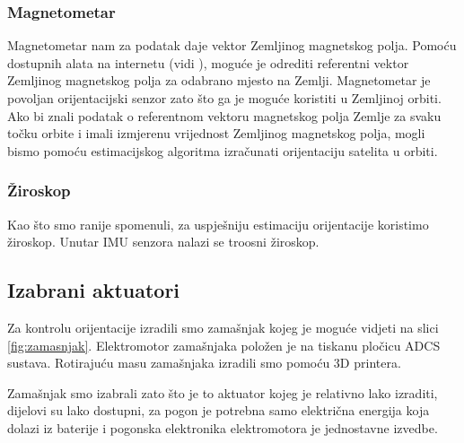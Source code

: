 \documentclass[times, utf8, diplomski, numeric]{templates/template}
\begin{document}
{{{            \subsubsection{Magnetometar}{
                Magnetometar nam za podatak daje vektor Zemljinog magnetskog polja. Pomoću dostupnih alata na internetu (vidi \cite{magnetic_model}), moguće je odrediti referentni vektor Zemljinog magnetskog polja za odabrano mjesto na Zemlji. Magnetometar je povoljan orijentacijski senzor zato što ga je moguće koristiti u Zemljinoj orbiti. Ako bi znali podatak o referentnom vektoru magnetskog polja Zemlje za svaku točku orbite i imali izmjerenu vrijednost Zemljinog magnetskog polja, mogli bismo pomoću estimacijskog algoritma izračunati orijentaciju satelita u orbiti.
            }

            \subsubsection{Žiroskop}{
                Kao što smo ranije spomenuli, za uspješniju estimaciju orijentacije koristimo žiroskop. Unutar IMU senzora nalazi se troosni žiroskop.
            }
        }

        \subsection{Izabrani aktuatori}{
            Za kontrolu orijentacije izradili smo zamašnjak kojeg je moguće vidjeti na slici \ref{fig:zamasnjak}. Elektromotor zamašnjaka položen je na tiskanu pločicu ADCS sustava. Rotirajuću masu zamašnjaka izradili smo pomoću 3D printera. 

            Zamašnjak smo izabrali zato što je to aktuator kojeg je relativno lako izraditi, dijelovi su lako dostupni, za pogon je potrebna samo električna energija koja dolazi iz baterije i pogonska elektronika elektromotora je jednostavne izvedbe.
 
}}}
\end{document}
